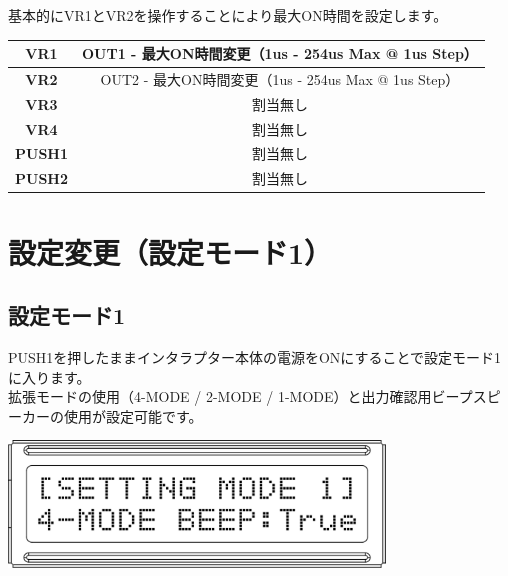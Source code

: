\documentclass[a4paper,11pt]{jsarticle}
\begin{document}
基本的にVR1とVR2を操作することにより最大ON時間を設定します。

\vspace*{5mm}

\begin{table}[htbp]
\begin{center}
\begin{tabular}{ | c | c | }
\hline
\textbf{VR1} & OUT1 - 最大ON時間変更（1us - 254us Max @ 1us Step） \\\hline
\textbf{VR2} & OUT2 - 最大ON時間変更（1us - 254us Max @ 1us Step） \\\hline
\textbf{VR3} & 割当無し \\\hline
\textbf{VR4} & 割当無し \\\hline
\textbf{PUSH1} & 割当無し \\\hline
\textbf{PUSH2} & 割当無し \\\hline
\end{tabular}
\end{center}
\end{table}



\clearpage

\section{設定変更（設定モード1）}

\subsection{設定モード1}

PUSH1を押したままインタラプター本体の電源をONにすることで設定モード1に入ります。 \\
拡張モードの使用（4-MODE / 2-MODE / 1-MODE）と出力確認用ビープスピーカーの使用が設定可能です。

\vspace*{10mm}
\begin{center}
\includegraphics[width=100mm]{image/Arduino_Interrupter_v1_LCD_SET_1.png}
\end{center}
\vspace*{10mm}
\end{document}
